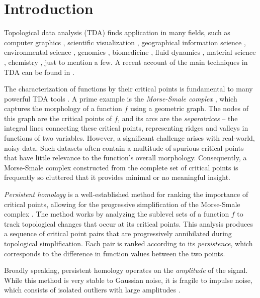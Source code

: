 

\section{Introduction}
Topological data analysis (TDA) finds application in many fields, such as computer graphics \cite{Weinkauf:2009}, scientific visualization \cite{Tierny:2017}, geographical information science \cite{Dey:2017,Rocca:2017fv,Xu:2020}, environmental science \cite{Valsangkar:2019}, genomics \cite{Rabadan_Blumberg_2019}, biomedicine \cite{SKAF2022}, fluid dynamics \cite{Gunther:2012,Sahner:2007}, material science \cite{Gyulassy:2007},  chemistry \cite{Olejniczak:2020}, just to mention a few. 
A recent account of the main techniques in TDA can be found in \cite{Dey_Wang_2022}.

The characterization of functions by their critical points is fundamental to many powerful TDA tools \cite{Dey_Wang_2022, Biasotti2008, Heine2016, ttk}. A prime example is the \emph{Morse-Smale complex} \cite{Smale63}, which captures the morphology of a function $f$ using a geometric graph. The nodes of this graph are the critical points of $f$, and its arcs are the \emph{separatrices} -- the integral lines connecting these critical points, representing ridges and valleys in functions of two variables.
However, a significant challenge arises with real-world, noisy data. Such datasets often contain a multitude of spurious critical points that have little relevance to the function's overall morphology. Consequently, a Morse-Smale complex constructed from the complete set of critical points is frequently so cluttered that it provides minimal or no meaningful insight.

\emph{Persistent homology} \cite{Edelsbrunner:2002ve} is a well-established method for ranking the importance of critical points, allowing for the progressive simplification of the Morse-Smale complex \cite{Bremer:2004,Edelsbrunner:2003dn}. The method works by analyzing the sublevel sets of a function $f$ to track topological changes that occur at its critical points. This analysis produces a sequence of critical point pairs that are progressively annihilated during topological simplification. Each pair is ranked according to its \emph{persistence}, which corresponds to the difference in function values between the two points.

Broadly speaking, persistent homology operates on the \emph{amplitude} of the signal. 
While this method is very stable to Gaussian noise, it is fragile to impulse noise, which consists of isolated outliers with large amplitudes \cite{reininghaus11}.

